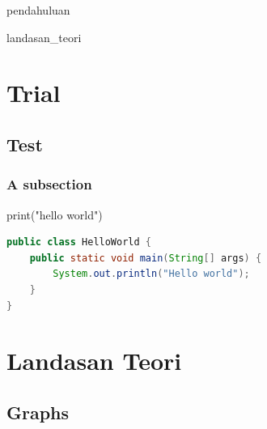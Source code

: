 \documentclass[oneside,12pt]{book}
\begin{document}
\begin{doublespace}

{pendahuluan}

{landasan_teori}

\chapter{Trial}
\section{Test}
\subsection{A subsection}
\lipsum[1-2]

\begin{pycode}
print("hello world")
\end{pycode}

\begin{lstlisting}[caption=Manual input, label={listing-java-manual},language=java,style=skripsilisting]
public class HelloWorld {
	public static void main(String[] args) {
		System.out.println("Hello world");
	}
}
\end{lstlisting}



\chapter{Landasan Teori}
\lipsum[1-2]

\section{Graphs}


\end{doublespace}
\end{document}
